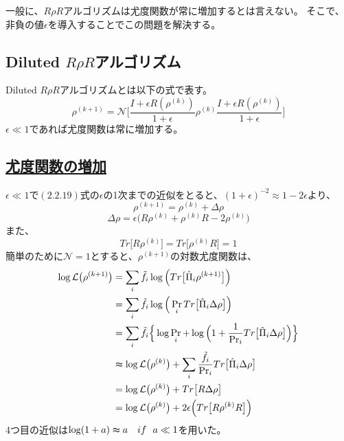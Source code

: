 \documentclass[11pt,a4j,notitlepage]{jreport}
\begin{document}
	一般に、$R \rho R$アルゴリズムは尤度関数が常に増加するとは言えない。
	そこで、非負の値$\epsilon$を導入することでこの問題を解決する。

	\subsection{Diluted $R \rho R$アルゴリズム}

	Diluted $R \rho R$アルゴリズムとは以下の式で表す。
	\begin{equation}
		\rho^{(k+1)} = \mathcal{N} \Bigg[ \frac{I + \epsilon R (\rho^{(k)})}{1+\epsilon} \rho^{(k)} \frac{I + \epsilon R (\rho^{(k)})}{1+\epsilon} \Bigg]
	\end{equation}
	$\epsilon \ll 1$であれば尤度関数は常に増加する。

	\subsection*{\underline{尤度関数の増加}}

	$\epsilon \ll 1$で$(2.2.19)$式の$\epsilon$の1次までの近似をとると、$(1 + \epsilon)^{-2} \approx 1 - 2\epsilon$より、
	\begin{equation}
		\rho^{(k+1)} = \rho^{(k)} + \Delta \rho
	\end{equation}
	\begin{equation}
		\Delta \rho = \epsilon \big( R \rho^{(k)} + \rho^{(k)} R -2 \rho^{(k)} \big)
	\end{equation}
	また、
	\begin{equation}
		Tr \big[ R \rho^{(k)} \big] = Tr \big[ \rho^{(k)} R \big] = 1 
	\end{equation}
	簡単のために$\mathcal{N} = 1$とすると、$\rho^{(k+1)}$の対数尤度関数は、
	\begin{equation}
		\begin{aligned}
			\log \mathcal{L} \big( \rho^{(k+1)} \big) &= \sum_i \tilde{f}_i \log \Big( Tr \big[ \hat{\Pi}_i \rho^{(k+1)} \big] \Big) \\
			&= \sum_i \tilde{f}_i \log \Big( \Pr_i Tr \big[ \hat{\Pi}_i \Delta \rho \big] \Big) \\
			&= \sum_i \tilde{f}_i \Big\{ \log \Pr_i + \log \Big( 1 + \frac{1}{\Pr_i} Tr \big[ \hat{\Pi}_i \Delta \rho \big] \Big) \Big\} \\
			&\thickapprox \log \mathcal{L} \big( \rho^{(k)} \big) + \sum_i \frac{\tilde{f}_i}{\Pr_i} Tr \big[ \hat{\Pi}_i \Delta \rho \big] \\
			&= \log \mathcal{L} \big( \rho^{(k)} \big) + Tr \big[ R \Delta \rho \big] \\
			&= \log \mathcal{L} \big( \rho^{(k)} \big) + 2 \epsilon \Big( Tr \big[ R \rho^{(k)} R \big] \Big)
		\end{aligned}
	\end{equation}
	4つ目の近似は$\log (1 + a) \thickapprox a\ \ \  if\ \  a \ll 1 $を用いた。\\
\end{document}

